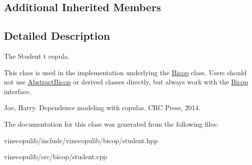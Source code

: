 \subsection*{Additional Inherited Members}


\subsection{Detailed Description}
The Student t copula. 

This class is used in the implementation underlying the \hyperlink{classvinecopulib_1_1_bicop}{Bicop} class. Users should not use \hyperlink{classvinecopulib_1_1_abstract_bicop}{Abstract\+Bicop} or derived classes directly, but always work with the \hyperlink{classvinecopulib_1_1_bicop}{Bicop} interface.

Joe, Harry. Dependence modeling with copulas. C\+R\+C Press, 2014. 

The documentation for this class was generated from the following files\+:\begin{DoxyCompactItemize}
\item 
vinecopulib/include/vinecopulib/bicop/student.\+hpp\item 
vinecopulib/src/bicop/student.\+cpp\end{DoxyCompactItemize}
